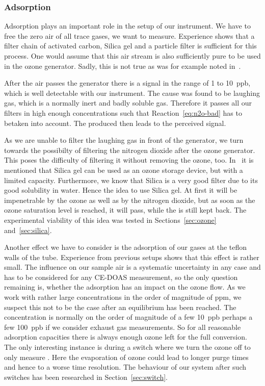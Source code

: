 \subsubsection{Adsorption}
\label{sec:adsorption}

Adsorption plays an important role in the setup of our
instrument. We have to free the zero air of all trace gases, we want
to measure. Experience shows that a filter chain of activated carbon,
Silica gel and a particle filter is sufficient for this process. One
would assume that this air stream is also sufficiently pure to be used
in the ozone generator. Sadly, this is not true as was for example
noted in~\cite{bsc}. 

After the air passes the generator there is a  signal in the
range of \num{1} to \SI{10}{ppb}, which is well detectable with our
instrument. The cause was found to be laughing gas, which is a normally
inert and badly soluble gas. Therefore it passes all our
filters in high enough concentrations such that
Reaction~\eqref{eq:n2o-bad} has to betaken into account. The produced
 then leads to the perceived  signal. 

As we are unable to filter the laughing gas in front of the generator,
we turn towards the possibilty of filtering the nitrogen dioxide after
the ozone generator. This poses the difficulty of filtering it without
removing the ozone, too. In~\cite{ozone-silica} it is mentioned that
Silica gel can be used as an ozone storage device, but with a limited
capacity. Furthermore, we know that Silica is a very good 
filter due to its good solubility in water. Hence the idea to use
Silica gel. At first it will be impenetrable by the ozone as well as
by the nitrogen dioxide, but as soon as the ozone saturation level is
reached, it will pass, while the  is still kept back. The
experimental viability of this idea was tested in
Sections~\ref{sec:ozone} and~\ref{sec:silica}.

Another effect we have to consider is the adsorption of our gases at
the teflon walls of the tube. Experience from previous setups shows
that this effect is rather small. The influence on our sample air is a
systematic uncertainty in any case and has to be considered for any
CE-DOAS measurement, so the only question remaining is, whether the
adsorption has an impact on the ozone flow. As we work with rather
large concentrations in the order of magnitude of \si{ppm}, we suspect
this not to be the case after an equilibrium has been reached. The
 concentration is normally on the order of magnitude of a few
\SI{10}{ppb} perhaps a few \SI{100}{ppb} if we consider exhaust gas
measurements. So for all reasonable adsorption capacities there is
always enough ozone left for the full conversion. The only interesting
instance is during a switch where we turn the ozone off to only
measure . Here the evaporation of ozone could lead to longer
purge times and hence to a worse time resolution. The behaviour of our
system after such switches has been researched in
Section~\ref{sec:switch}.

